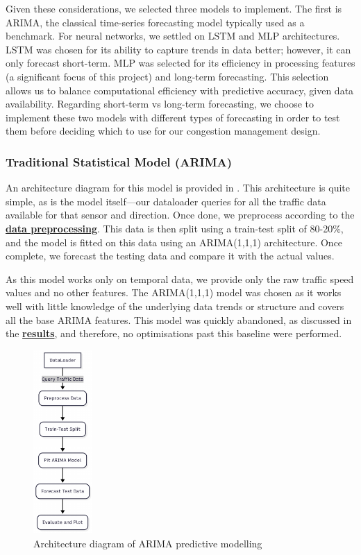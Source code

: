 Given these considerations, we selected three models to implement. The first is ARIMA, the classical time-series forecasting model typically used as a benchmark. For neural networks, we settled on LSTM and MLP architectures. LSTM was chosen for its ability to capture trends in data better; however, it can only forecast short-term. MLP was selected for its efficiency in processing features (a significant focus of this project) and long-term forecasting. This selection allows us to balance computational efficiency with predictive accuracy, given data availability. Regarding short-term vs long-term forecasting, we choose to implement these two models with different types of forecasting in order to test them before deciding which to use for our congestion management design.

\subsubsection{Traditional Statistical Model (ARIMA)}
An architecture diagram for this model is provided in . This architecture is quite simple, as is the model itself—our dataloader queries for all the traffic data available for that sensor and direction. Once done, we preprocess according to the \textbf{\hyperref[link:data-preprocessing]{data preprocessing}}. This data is then split using a train-test split of 80-20\%, and the model is fitted on this data using an ARIMA(1,1,1) architecture. Once complete, we forecast the testing data and compare it with the actual values.

As this model works only on temporal data, we provide only the raw traffic speed values and no other features. The ARIMA(1,1,1) model was chosen as it works well with little knowledge of the underlying data trends or structure and covers all the base ARIMA features. This model was quickly abandoned, as discussed in the \textbf{\hyperref[link:arima-results]{results}}, and therefore, no optimisations past this baseline were performed.

\begin{figure}[!ht]
  \centering
  \includegraphics[width=0.2\textwidth]{images/design-implementation/arima.pdf}
  \caption{Architecture diagram of ARIMA predictive modelling}
  \label{fig:arima-arch}
\end{figure}

